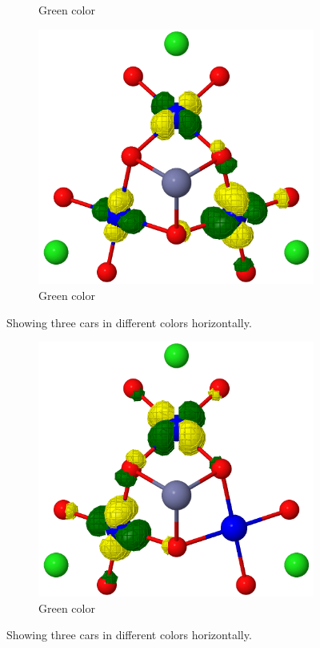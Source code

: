 \documentclass[12pt]{report}
\numberwithin{equation}{section}
\begin{document}
\begin{figure}
\begin{subfigure}{0.3\linewidth}
        \caption{Green color}
        \label{fig:subfigD}
     \end{subfigure}
\label{fig:subfigures}
\begin{subfigure}{0.3\linewidth}
    \includegraphics[width=\linewidth]{Images/mo5.trimer.png}
    \caption{Green color}
    \label{fig:subfigE}
 \end{subfigure}
\caption{Showing three cars in different colors horizontally.}
\label{fig:subfigures}
\begin{subfigure}{0.3\linewidth}
    \includegraphics[width=\linewidth]{Images/mo6.trimer.png}
    \caption{Green color}
    \label{fig:subfigF}
 \end{subfigure}
\caption{Showing three cars in different colors horizontally.}
\label{fig:subfigures}
\end{figure}
\end{document}
